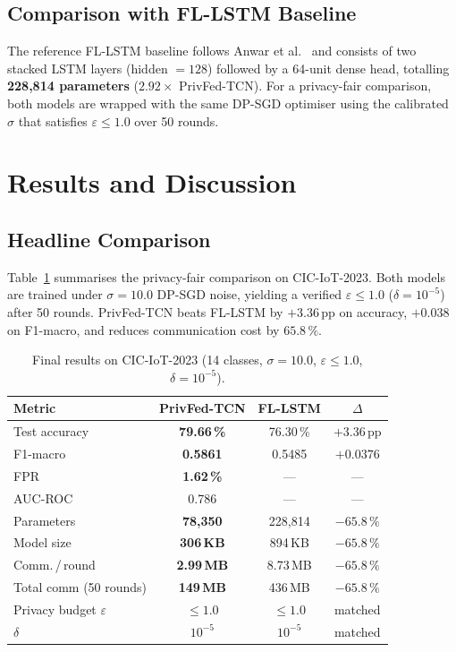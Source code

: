 \documentclass[conference]{IEEEtran}
\newcommand{\eps}{\varepsilon}
\begin{document}
\subsection{Comparison with FL-LSTM Baseline}
The reference FL-LSTM baseline follows
Anwar et al.~\cite{anwar2025} and consists of two stacked LSTM layers
(hidden $=128$) followed by a 64-unit dense head, totalling
\textbf{228,814 parameters} ($2.92\times$ PrivFed-TCN). For a
privacy-fair comparison, both models are wrapped with the same
DP-SGD optimiser using the calibrated $\sigma$ that satisfies
$\eps\le 1.0$ over 50 rounds.

\section{Results and Discussion}\label{sec:results}

\subsection{Headline Comparison}
Table~\ref{tab:headline} summarises the privacy-fair comparison on
CIC-IoT-2023. Both models are trained under
$\sigma=10.0$ DP-SGD noise, yielding a verified $\eps\le 1.0$
($\delta=10^{-5}$) after 50 rounds. PrivFed-TCN beats FL-LSTM by
$+3.36$\,pp on accuracy, $+0.038$ on F1-macro, and reduces
communication cost by $65.8\,\%$.

\begin{table}[t]
\centering
\caption{Final results on CIC-IoT-2023 (14 classes, $\sigma{=}10.0$,
         $\eps\!\le\!1.0$, $\delta\!=\!10^{-5}$).}
\label{tab:headline}
\renewcommand{\arraystretch}{1.18}
\begin{tabular}{lccc}
\toprule
\textbf{Metric} & \textbf{PrivFed-TCN} & \textbf{FL-LSTM} & $\Delta$ \\
\midrule
Test accuracy           & \textbf{79.66\,\%} & 76.30\,\% & $+3.36$\,pp \\
F1-macro                & \textbf{0.5861}    & 0.5485    & $+0.0376$   \\
FPR                     & \textbf{1.62\,\%}  & ---       & ---         \\
AUC-ROC                 & 0.786              & ---       & ---         \\
\midrule
Parameters              & \textbf{78,350}    & 228,814   & $-65.8\,\%$ \\
Model size              & \textbf{306\,KB}   & 894\,KB   & $-65.8\,\%$ \\
Comm.\,/\,round         & \textbf{2.99\,MB}  & 8.73\,MB  & $-65.8\,\%$ \\
Total comm (50 rounds)  & \textbf{149\,MB}   & 436\,MB   & $-65.8\,\%$ \\
\midrule
Privacy budget $\eps$   & $\le 1.0$          & $\le 1.0$ & matched     \\
$\delta$                & $10^{-5}$          & $10^{-5}$ & matched     \\
\bottomrule
\end{tabular}
\end{table}
\end{document}
